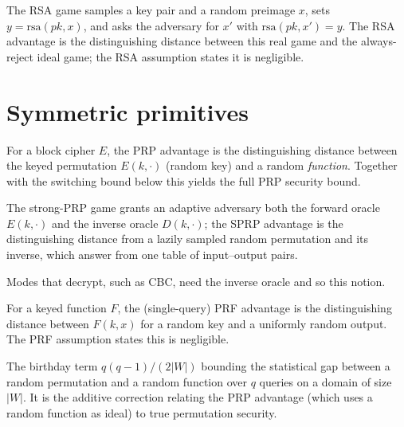 \begin{definition}
  \label{def:rsa}
  \leanok
  The RSA game samples a key pair and a random preimage $x$, sets
  $y = \mathrm{rsa}(pk, x)$, and asks the adversary for $x'$ with
  $\mathrm{rsa}(pk, x') = y$. The RSA advantage is the distinguishing distance
  between this real game and the always-reject ideal game; the RSA assumption
  states it is negligible.
\end{definition}

\section{Symmetric primitives}

\begin{definition}
  \label{def:prp}
  \leanok
  For a block cipher $E$, the PRP advantage is the distinguishing distance
  between the keyed permutation $E(k, \cdot)$ (random key) and a random
  \emph{function}. Together with the switching bound below this yields the full
  PRP security bound.
\end{definition}

\begin{definition}
  \label{def:sprp}
  \leanok
  The strong-PRP game grants an adaptive adversary both the forward oracle
  $E(k, \cdot)$ and the inverse oracle $D(k, \cdot)$; the SPRP advantage is the
  distinguishing distance from a lazily sampled random permutation and its
  inverse, which answer from one table of input--output pairs.
\end{definition}

Modes that decrypt, such as CBC, need the inverse oracle and so this notion.

\begin{definition}
  \label{def:prf}
  \leanok
  For a keyed function $F$, the (single-query) PRF advantage is the
  distinguishing distance between $F(k, x)$ for a random key and a uniformly
  random output. The PRF assumption states this is negligible.
\end{definition}

\begin{definition}
  \label{def:prp-prf-switch}
  \leanok
  The birthday term $q(q-1)/(2|W|)$ bounding the statistical gap between a random
  permutation and a random function over $q$ queries on a domain of size $|W|$.
  It is the additive correction relating the PRP advantage (which uses a random
  function as ideal) to true permutation security.
\end{definition}

